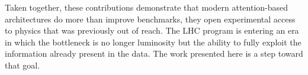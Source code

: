 Taken together, these contributions demonstrate that modern attention-based architectures do more than improve benchmarks, they open experimental access to physics that was previously out of reach.
The LHC program is entering an era in which the bottleneck is no longer luminosity but the ability to fully exploit the information already present in the data.
The work presented here is a step toward that goal.
